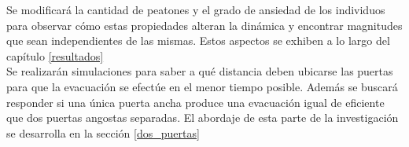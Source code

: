 Se modificará la cantidad de peatones y el grado de ansiedad de los individuos para observar cómo estas propiedades alteran la dinámica y encontrar magnitudes que sean independientes de las mismas. Estos aspectos se exhiben a lo largo del capítulo \ref{resultados} \\

Se realizarán simulaciones para saber a qué distancia deben ubicarse las puertas para que la evacuación se efectúe en el menor tiempo posible. Además se buscará responder si una única puerta ancha produce una evacuación igual de eficiente que dos puertas angostas separadas. El abordaje de esta parte de la investigación se desarrolla en la sección \ref{dos_puertas} 




